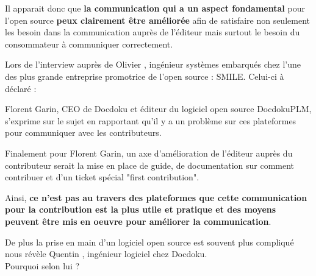 			Il apparait donc que \textbf{la communication qui a un aspect fondamental} pour l'open source \textbf{peux clairement être améliorée} afin de satisfaire non seulement les besoin dans la communication auprès de l'éditeur mais surtout le besoin du consommateur à communiquer correctement.

			Lors de l'interview auprès de Olivier , ingénieur systèmes embarqués chez l'une des plus grande entreprise promotrice de l'open source : SMILE. Celui-ci à déclaré : 

			\begin{center}
				\textit{
				}
			\end{center}

			Florent Garin, CEO de Docdoku et éditeur du logiciel open source DocdokuPLM, s'exprime sur le sujet en rapportant qu'il y a un problème sur ces plateformes pour communiquer avec les contributeurs.

			\begin{center}
				\textit{
				}
			\end{center}

			Finalement pour Florent Garin, un axe d'amélioration de l'éditeur auprès du contributeur serait la mise en place de guide, de documentation sur comment contribuer et d'un ticket spécial "first contribution".

			Ainsi, \textbf{ce n'est pas au travers des plateformes que cette communication pour la contribution est la plus utile et pratique et des moyens peuvent être mis en oeuvre pour améliorer la communication}.

			De plus la prise en main d'un logiciel open source est souvent plus compliqué nous révèle Quentin , ingénieur logiciel chez Docdoku.\\

			Pourquoi selon lui ?

			\begin{center}
				\textit{
				}
			\end{center}

